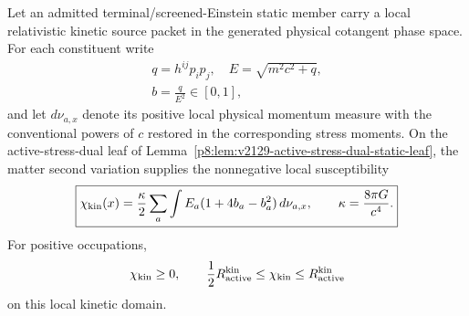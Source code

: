 \documentclass[12pt,a4paper]{article}
\begin{document}
\begin{theorem}
\label{p8:thm:v2129-action-owned-environmental-hessian}
\leavevmode\par
Let an admitted terminal/screened-Einstein static member carry a local
relativistic kinetic source packet in the generated physical cotangent phase
space.  For each constituent write
\[
 \begin{gathered}
 q=h^{ij}p_ip_j,\quad E=\sqrt{m^2c^2+q},\\
 b=\frac{q}{E^2}\in[0,1],
 \end{gathered}
\]
and let $d\nu_{a,x}$ denote its positive local physical momentum measure with
the conventional powers of $c$ restored in the corresponding stress moments.
On the active-stress-dual leaf of
Lemma~\ref{p8:lem:v2129-active-stress-dual-static-leaf}, the matter second
variation supplies the nonnegative local susceptibility
\begin{equation}
\boxed{
 \chi_{\rm kin}(x)
 =\frac{\kappa}{2}\sum_a\int
 E_a(1+4b_a-b_a^2)\,d\nu_{a,x},
 \qquad
 \kappa=\frac{8\pi G}{c^4}.}
\label{p8:eq:v2129-kinetic-environment-susceptibility}
\end{equation}
For positive occupations,
\begin{equation}
 \chi_{\rm kin}\ge0,
 \qquad
 \frac12R_{\rm active}^{\rm kin}
 \le \chi_{\rm kin}\le R_{\rm active}^{\rm kin}
\label{p8:eq:v2129-kinetic-susceptibility-bounds}
\end{equation}
on this local kinetic domain.


\end{theorem}
\end{document}
